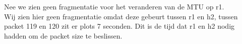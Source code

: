 Nee we zien geen fragmentatie voor het veranderen van de MTU op r1. \\

Wij zien hier geen fragmentatie omdat deze gebeurt tussen r1 en h2, tussen packet 119 en 120 zit er plots 7 seconden. Dit is de tijd dat r1 en h2 nodig hadden om de packet size te beslissen. 